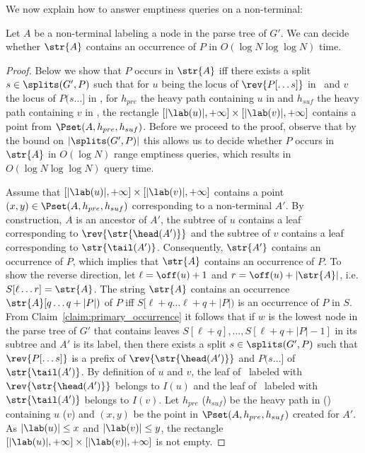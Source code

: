 We now explain how to answer emptiness queries on a non-terminal:
\begin{claim}\label{claim:emptiness}
Let $A$ be a non-terminal labeling a node in the parse tree of $G'$. We can decide whether $\str{A}$ contains an occurrence of $P$ in $O(\log N\log \log N)$ time. 
\end{claim} 
\begin{proof}
Below we show that $P$ occurs in $\str{A}$ iff there exists a split $s \in \splits(G',P)$ such that for $u$ being the locus of $\rev{P[\dots s]}$ in \Tpre\ and $v$ the locus of $P(s \dots]$ in \Tsuf , for $h_{pre}$ the heavy path containing $u$ in \Tpre and $h_{suf}$ the heavy path containing $v$ in \Tsuf , the rectangle $[|\lab(u)|,+\infty] \times [|\lab(v)|,+\infty]$ contains a point from $\Pset(A,h_{pre},h_{suf})$. Before we proceed to the proof, observe that by the bound on $|\splits(G',P)|$ this allows us to decide whether $P$ occurs in $\str{A}$ in $O(\log N)$ range emptiness queries, which results in $O(\log N\log \log N)$ query time. 

Assume that $[|\lab(u)|,+\infty] \times [|\lab(v)|,+\infty]$ contains a point $(x,y) \in \Pset(A,h_{pre},h_{suf})$ corresponding to a non-terminal $A'$. By construction, $A$ is an ancestor of $A'$, the subtree of $u$ contains a leaf corresponding to $\rev{\str{\head(A')}}$ and the subtree of $v$ contains a leaf corresponding to $\str{\tail(A')}$. Consequently, $\str{A'}$ contains an occurrence of $P$, which implies that $\str{A}$ contains an occurrence of $P$. 
%
To show the reverse direction, let $\ell = \off(u)+1$ and $r = \off(u)+|\str{A}|$, i.e. $S[\ell \dots r] = \str{A}$. The string $\str{A}$ contains an occurrence $\str{A}[q \ldots q+|P|)$ of $P$ iff $S[\ell+q \ldots \ell+q+|P|)$ is an occurrence of $P$ in $S$. From Claim~\ref{claim:primary_occurrence} it follows that if $w$ is the lowest node in the parse tree of $G'$ that contains leaves $S[\ell+q], \dots, S[\ell+q+|P|-1]$ in its subtree and $A'$ is its label, then there exists a split $s \in \splits(G',P)$ such that $\rev{P[\dots s]}$ is a prefix of $\rev{\str{\head(A')}}$ and $P(s\dots ]$ of $\str{\tail(A')}$. By definition of $u$ and $v$, the leaf of \Tpre\ labeled with $\rev{\str{\head(A')}}$ belongs to $I(u)$ and the leaf of \Tsuf\ labeled with $\str{\tail(A')}$ belongs to $I(v)$. Let $h_{pre}$ ($h_{suf}$) be the heavy path in \Tpre (\Tsuf) containing $u$ ($v$) and $(x,y)$ be the point in $\Pset(A,h_{pre},h_{suf})$ created for $A'$. As $|\lab(u)| \le x$ and $|\lab(v)| \le y$, the rectangle $[|\lab(u)|,+\infty] \times [|\lab(v)|,+\infty]$ is not empty.  
\end{proof}

